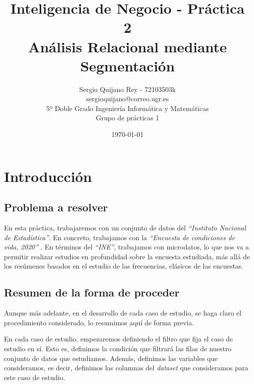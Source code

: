 \documentclass[11pt]{article}
\title{
    {Inteligencia de Negocio - Práctica 2} \\
    {Análisis Relacional mediante Segmentación}
}
\author{
    {Sergio Quijano Rey - 72103503k}\\
    {sergioquijano@correo.ugr.es} \\
    {5º Doble Grado Ingeniería Informática y Matemáticas} \\
    {Grupo de prácticas 1}
}
\date{\today}
\newcommand{\entrecomillado}[1]{\emph{``#1''}}
\begin{document}
\maketitle
\pagebreak

\tableofcontents


\listoffigures


{}

\pagebreak

\section{Introducción}

\subsection{Problema a resolver}

En esta práctica, trabajaremos con un conjunto de datos del \entrecomillado{Instituto Nacional de Estadística}. En concreto, trabajamos con la \entrecomillado{Encuesta de condiciones de vida, 2020} \cite{original_dataset:online}. En términos del \entrecomillado{INE}, trabajamos con microdatos, lo que nos va a permitir realizar estudios en profundidad sobre la encuesta estudiada, más allá de los resúmenes basados en el estudio de las frecuencias, clásicos de las encuestas.

\subsection{Resumen de la forma de proceder}

Aunque más adelante, en el desarrollo de cada caso de estudio, se haga claro el procedimiento considerado, lo resumimos aquí de forma previa.

En cada caso de estudio, empezaremos definiendo el filtro que fija el caso de estudio en sí. Esto es, definimos la condición que filtrará las filas de nuestro conjunto de datos que estudiamos. Además, definimos las variables que consideramos, es decir, definimos las columnas del \emph{dataset} que consideramos para este caso de estudio.
\end{document}
